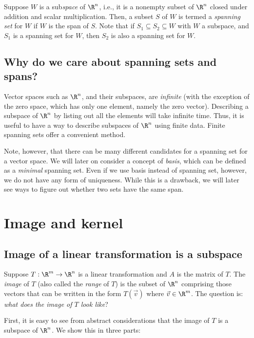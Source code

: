 \documentclass[10pt]{amsart}
\begin{document}
Suppose $W$ is a sub{\em space} of $\R^n$, i.e., it is a nonempty
subset of $\R^n$ closed under addition and scalar
multiplication. Then, a subset $S$ of $W$ is termed a {\em spanning
  set} for $W$ if $W$ is the span of $S$. Note that if $S_1 \subseteq S_2
\subseteq W$ with $W$ a subspace, and $S_1$ is a spanning set for $W$,
then $S_2$ is also a spanning set for $W$.

\subsection{Why do we care about spanning sets and spans?}

Vector spaces such as $\R^n$, and their subspaces, are {\em infinite}
(with the exception of the zero space, which has only one element,
namely the zero vector). Describing a subspace of $\R^n$ by listing
out all the elements will take infinite time. Thus, it is useful to
have a way to describe subspaces of $\R^n$ using finite data. Finite
spanning sets offer a convenient method.

Note, however, that there can be many different candidates for a
spanning set for a vector space. We will later on consider a concept
of {\em basis}, which can be defined as a {\em minimal} spanning
set. Even if we use basis instead of spanning set, however, we do not
have any form of uniqueness. While this is a drawback, we will later
see ways to figure out whether two sets have the same span.

\section{Image and kernel}

\subsection{Image of a linear transformation is a subspace}

Suppose $T:\R^m \to \R^n$ is a linear transformation and $A$ is the
matrix of $T$. The {\em image} of $T$ (also called the {\em range} of
$T$) is the subset of $\R^n$ comprising those vectors that can be
written in the form $T(\vec{v})$ where $\vec{v} \in \R^m$. The
question is: {\em what does the image of $T$ look like}?

First, it is easy to see from abstract considerations that the image
of $T$ is a subspace of $\R^n$. We show this in three parts:
\end{document}
